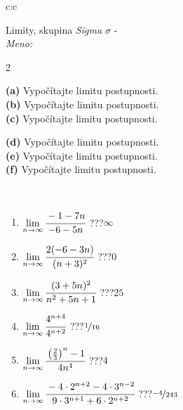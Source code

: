 \documentclass[10pt]{report}
\begin{document}
\newpage
\thispagestyle{empty}
\begin{tabular}{c:c}
\begin{minipage}[c][104.5mm][t]{0.5\linewidth}
\begin{center}
\vspace{5mm}
{\huge Limity, skupina \textit{Sigma $\sigma$} -}\\[5mm]
\textit{Meno:}\phantom{xxxxxxxxxxxxxxxxxxxxxxxxxxxxxxxxxxxxxxxxxxxxxxxxxxxxxxxxxxxxxxxxx}\\[5mm]
\begin{minipage}{0.95\linewidth}
\begin{center}
{\small \begin{multicols}{2} \raggedright
\textbf{(a)} Vypočítajte limitu postupnosti. \\[1mm]
\textbf{(b)} Vypočítajte limitu postupnosti. \\[1mm]
\textbf{(c)} Vypočítajte limitu postupnosti. \par \columnbreak
\textbf{(d)} Vypočítajte limitu postupnosti. \\[1mm]
\textbf{(e)} Vypočítajte limitu postupnosti. \\[1mm]
\textbf{(f)} Vypočítajte limitu postupnosti.
\end{multicols}
}
\end{center}
\end{minipage}
\\[1mm]
\begin{minipage}{0.79\linewidth}
\begin{center}
\begin{varwidth}{\linewidth}
\setlength{\itemsep}{0pt}
\begin{enumerate}
\footnotesizerr
\item $\lim\limits_{n\to\infty}\cfrac{-1-7n}{-6-5n}$\quad \dotfill\; ???\;\dotfill \quad $\infty$
\item $\lim\limits_{n\to\infty}\cfrac{2(-6-3n)}{(n+3)^2}$\quad \dotfill\; ???\;\dotfill \quad $0$
\item $\lim\limits_{n\to\infty}\cfrac{(3+5n)^2}{n^2+5n+1}$\quad \dotfill\; ???\;\dotfill \quad $25$
\item $\lim\limits_{n\to\infty}\cfrac{4^{n+4}}{4^{n+2}}$\quad \dotfill\; ???\;\dotfill \quad $\nicefrac{1}{16}$
\item $\lim\limits_{n\to\infty}\cfrac{\left(\frac{2}{3}\right)^n -1}{4n^{4}}$\quad \dotfill\; ???\;\dotfill \quad $4$
\item $\lim\limits_{n\to\infty}\cfrac{-4\cdot 2^{n+2}-4\cdot 3^{n-2}}{9\cdot 3^{n+1}+6\cdot 2^{n+2}}$\quad \dotfill\; ???\;\dotfill \quad $\nicefrac{-4}{243}$

\end{enumerate}
\end{varwidth}
\end{center}
\end{minipage}
\end{center}
\end{minipage}
\end{tabular}
\end{document}

